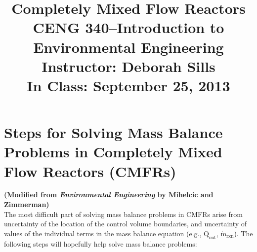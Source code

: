 \documentclass[12pt,letterpaper]{article}
\begin{document}
\setlength{\parindent}{0cm} 



\frenchspacing

\setlength{\textwidth}{6.25in}

\title {\Large{\textbf{Completely Mixed Flow Reactors}}\\ \large{CENG 340--Introduction to Environmental Engineering\\
Instructor: Deborah Sills\\ \textbf{In Class: September 25, 2013}}}

\author {}
\date {}
\maketitle

\vspace{-1.5cm}

\section *{Steps for Solving Mass Balance Problems in Completely Mixed Flow Reactors (CMFRs)}
\textbf{(Modified from \emph{Environmental Engineering} by Mihelcic and Zimmerman)}\\
The most difficult part of solving mass balance problems in CMFRs arise from uncertainty of the location of the control volume boundaries, and uncertainty of values of the individual terms in the mass balance equation (e.g., $\mathrm{Q_{out}}$, $\mathrm{\dot{m}_{rxn}}$).  The following steps will hopefully help solve mass balance problems:
\end{document}
